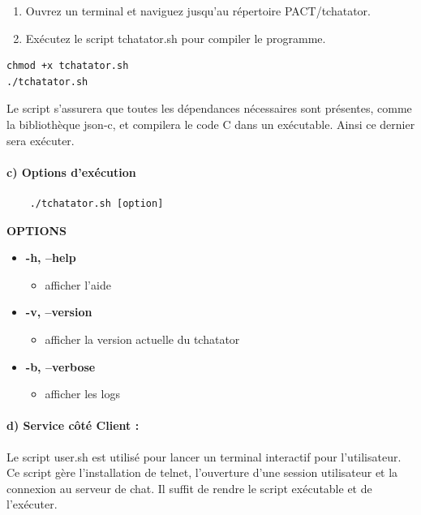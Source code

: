 \documentclass{report}
\begin{document}
\begin{enumerate}
	\item Ouvrez un terminal et naviguez jusqu'au répertoire PACT/tchatator.
	\item Exécutez le script tchatator.sh pour compiler le programme.
\end{enumerate}

\begin{verbatim}
chmod +x tchatator.sh
./tchatator.sh
\end{verbatim}

Le script s'assurera que toutes les dépendances nécessaires sont présentes, comme la bibliothèque json-c, et compilera le code C dans un exécutable. Ainsi ce dernier sera exécuter.

\paragraph{c) Options d'exécution}

\begin{verbatim}
	./tchatator.sh [option]
\end{verbatim}

\large \textbf{OPTIONS}

\begin{itemize}[label={}]
	\item \textbf{-h, --help}
	\begin{itemize}
		\item afficher l’aide
	\end{itemize}
	\item \textbf{-v, --version}
	\begin{itemize}
		\item afficher la version actuelle du tchatator
	\end{itemize}
	\item \textbf{-b, --verbose}
	\begin{itemize}
		\item afficher les logs
	\end{itemize}
\end{itemize}

\paragraph{d) Service côté Client :}

Le script user.sh est utilisé pour lancer un terminal interactif pour l'utilisateur. Ce script gère l'installation de telnet, l'ouverture d'une session utilisateur et la connexion au serveur de chat. Il suffit de rendre le script exécutable et de l'exécuter.
\end{document}
